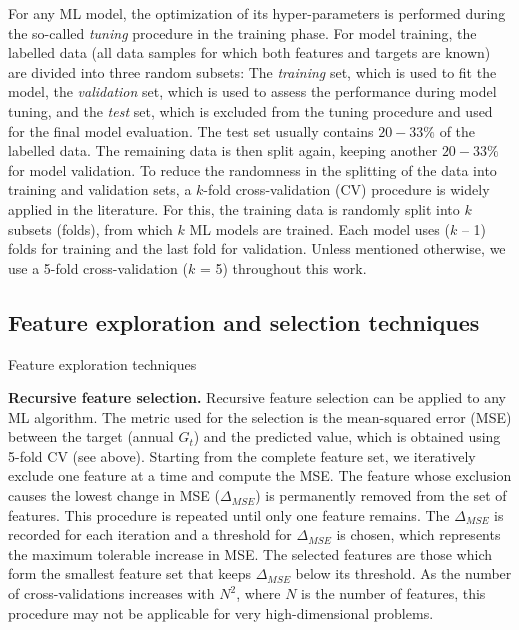 For any ML model, the optimization of its hyper-parameters is performed during the so-called \textit{tuning} procedure in the training phase. For model training, the labelled data (all data samples for which both features and targets are known) are divided into three random subsets: 
The \textit{training} set, which is used to fit the model, the \textit{validation} set, which is used to assess the performance during model tuning, and the \textit{test} set, which is excluded from the tuning procedure and used for the final model evaluation.
The test set usually contains $20 - 33\%$ of the labelled data. The remaining data is then split again, keeping another $20 - 33\%$ for model validation.
To reduce the randomness in the splitting of the data into training and validation sets, a $k$-fold cross-validation (CV) procedure is widely applied in the literature. 
For this, the training data is randomly split into $k$ subsets (folds), from which $k$ ML models are trained. Each model uses ($k$ – 1) folds for training and the last fold for validation. 
Unless mentioned otherwise, we use a 5-fold cross-validation ($k$ = 5) throughout this work.
% 

\subsection{Feature exploration and selection techniques}
\label{ML_features}

 Feature exploration techniques 

\textbf{Recursive feature selection.} Recursive feature selection can be applied to any ML algorithm. The metric used for the selection is the mean-squared error (MSE) between the target (annual $G_t$) and the predicted value, which is obtained using 5-fold CV (see above). 
Starting from the complete feature set, we iteratively exclude one feature at a time and compute the MSE. The feature whose exclusion causes the lowest change in MSE ($\Delta_{MSE}$) is permanently removed from the set of features. This procedure is repeated until only one feature remains. The $\Delta_{MSE}$ is recorded for each iteration and a threshold for $\Delta_{MSE}$ is chosen, which represents the maximum tolerable increase in MSE. The selected features are those which form the smallest feature set that keeps $\Delta_{MSE}$ below its threshold. As the number of cross-validations increases with $N^2$, where $N$ is the number of features, this procedure may not be applicable for very high-dimensional problems.


